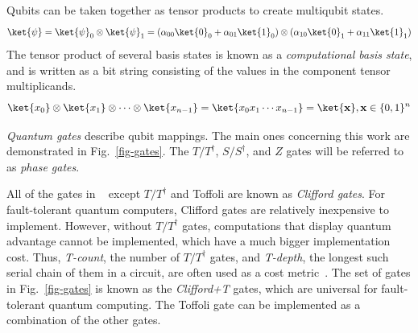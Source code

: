 

Qubits can be taken together as tensor products to create multiqubit states.
\begin{equation}
\label{eq-multi-qb}
\ket{\psi} = \ket{\psi}_0 \otimes \ket{\psi}_1 =(\alpha_{00} \ket{0}_0 + \alpha_{01} \ket{1}_0) \otimes
(\alpha_{10} \ket{0}_1 + \alpha_{11} \ket{1}_1)
\end{equation}
The tensor product of several basis states is known as a \emph{computational basis state},
and is written as a bit string consisting of the values in the component tensor multiplicands.
\begin{equation}
\ket{x_0}\otimes\ket{x_1}\otimes\cdots\otimes\ket{x_{n-1}}=\ket{x_0 x_1 \cdots x_{n-1}}=\ket{\mathbf{x}},
\mathbf{x} \in \{0,1\}^n
\end{equation}


{\it Quantum gates} describe qubit mappings. The main ones concerning this work
are demonstrated in Fig.~\ref{fig-gates}. The $T/T^{\dagger}$, $S/S^{\dagger}$, and $Z$
gates will be referred to as {\it phase gates}.

All of the gates in ~ except $T/T^{\dagger}$ and Toffoli are known as
{\it Clifford gates}. For fault-tolerant quantum computers, Clifford gates are relatively
inexpensive to implement. However, without $T/T^{\dagger}$ gates, computations that display
quantum advantage cannot be implemented, which have a much bigger implementation cost. Thus,
{\it T-count}, the number of $T/T^{\dagger}$ gates, and {\it T-depth}, the longest such
serial chain of them in a circuit, are often used as a cost metric~\cite{amy-meet-in-middle}.
The set of gates in Fig.~\ref{fig-gates} is known as the {\it Clifford+T} gates, which are
universal for fault-tolerant quantum computing. The Toffoli gate can be implemented as a
combination of the other gates.

